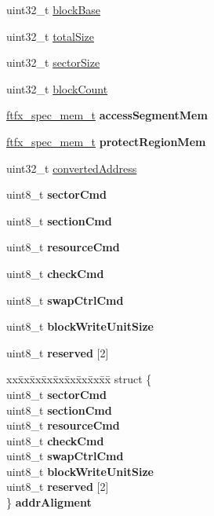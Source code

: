 \begin{DoxyCompactItemize}
\begin{tabbing}
\end{tabbing}\item 
uint32\+\_\+t \mbox{\hyperlink{group__ftfx__controller_ga1cd6b415d1fb5e98f12125b7863691e2}{block\+Base}}
\item 
uint32\+\_\+t \mbox{\hyperlink{group__ftfx__controller_gafd8a6a01e3b212857df6efb82e06f682}{total\+Size}}
\item 
uint32\+\_\+t \mbox{\hyperlink{group__ftfx__controller_ga0531bf8e2d0ac7dbf0d6af9b74a6ae0f}{sector\+Size}}
\item 
uint32\+\_\+t \mbox{\hyperlink{group__ftfx__controller_ga359235f8ff745acf36826f7859097c4f}{block\+Count}}
\item 
\mbox{\label{group__ftfx__controller_gadda32a4c7d83030a8211defd3fd13f47}} 
\mbox{\hyperlink{group__ftfx__controller_ga6a3bd19cb0ff32d44e464562765a8127}{ftfx\+\_\+spec\+\_\+mem\+\_\+t}} {\bfseries access\+Segment\+Mem}
\item 
\mbox{\label{group__ftfx__controller_gab81692cc4054093d17ae359a6497165d}} 
\mbox{\hyperlink{group__ftfx__controller_ga6a3bd19cb0ff32d44e464562765a8127}{ftfx\+\_\+spec\+\_\+mem\+\_\+t}} {\bfseries protect\+Region\+Mem}
\item 
uint32\+\_\+t \mbox{\hyperlink{group__ftfx__controller_ga103f050a0770fca8ee73b78a283337a1}{converted\+Address}}
\item 
uint8\+\_\+t {\bfseries sector\+Cmd}
\item 
uint8\+\_\+t {\bfseries section\+Cmd}
\item 
uint8\+\_\+t {\bfseries resource\+Cmd}
\item 
uint8\+\_\+t {\bfseries check\+Cmd}
\item 
uint8\+\_\+t {\bfseries swap\+Ctrl\+Cmd}
\item 
uint8\+\_\+t {\bfseries block\+Write\+Unit\+Size}
\item 
uint8\+\_\+t {\bfseries reserved} \mbox{[}2\mbox{]}
\item 
\mbox{\label{group__ftfx__controller_ga1ee8f7eb605aed2ad8c93d54b6d67ea6}} 
\begin{tabbing}
xx\=xx\=xx\=xx\=xx\=xx\=xx\=xx\=xx\=\kill
struct \{\\
\>uint8\_t {\bfseries sectorCmd}\\
\>uint8\_t {\bfseries sectionCmd}\\
\>uint8\_t {\bfseries resourceCmd}\\
\>uint8\_t {\bfseries checkCmd}\\
\>uint8\_t {\bfseries swapCtrlCmd}\\
\>uint8\_t {\bfseries blockWriteUnitSize}\\
\>uint8\_t {\bfseries reserved} \mbox{[}2\mbox{]}\\
\} {\bfseries addrAligment}\\


\end{tabbing}
\end{DoxyCompactItemize}

